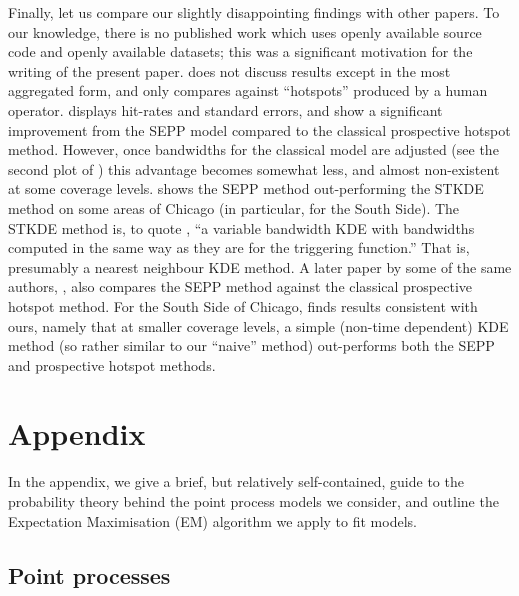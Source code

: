 \documentclass[twoside,a4paper]{article}
\theoremstyle{plain}
\theoremstyle{definition}
\begin{document}
Finally, let us compare our slightly disappointing findings with other papers.
To our knowledge, there is no published work which uses openly available source code
and openly available datasets; this was a significant motivation for the writing of the
present paper.  \cite{sepp2} does not discuss results except in the most aggregated form,
and only compares against ``hotspots'' produced by a human operator.  
\cite[Figure~6]{sepp} displays hit-rates and standard errors, and show a significant
improvement from the SEPP model compared to the classical prospective hotspot method.
However, once bandwidths for the classical model are adjusted (see the second plot
of \cite[Figure~6]{sepp}) this advantage becomes somewhat less, and almost non-existent
at some coverage levels.  \cite[Figure~12]{rc} shows the SEPP method out-performing the
STKDE method on some areas of Chicago (in particular, for the South Side).  The STKDE
method is, to quote \cite{rc}, ``a variable bandwidth KDE with bandwidths computed in the
same way as they are for the triggering function.''  That is, presumably a nearest neighbour
KDE method.  A later paper by some of the same authors, \cite{arc}, also compares the SEPP
method against the classical prospective hotspot method.  For the South Side of Chicago,
\cite[Figure~5]{arc} finds results consistent with ours, namely that at smaller coverage
levels, a simple (non-time dependent) KDE method (so rather similar to our ``naive''
method) out-performs both the SEPP and prospective hotspot methods.





\appendix
\section{Appendix}

In the appendix, we give a brief, but relatively self-contained, guide to the probability
theory behind the point process models we consider, and outline the Expectation
Maximisation (EM) algorithm we apply to fit models.


\subsection{Point processes}\label{app:pp}
\end{document}
